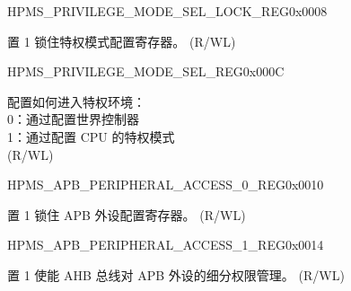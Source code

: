 


\begin{register}{H}{PMS\_PRIVILEGE\_MODE\_SEL\_LOCK\_REG}{0x0008}\label{regdesc:PMSPRIVILEGEMODESELLOCKREG}
%
%
\regnewline%
\begin{regdesc}\begin{reglist}
\label{fielddesc:PMSPRIVILEGEMODESELLOCK}\item [PMS\_PRIVILEGE\_MODE\_SEL\_LOCK] 置 1 锁住特权模式配置寄存器。 (R/WL)
\end{reglist}\end{regdesc}
\end{register}

\begin{register}{H}{PMS\_PRIVILEGE\_MODE\_SEL\_REG}{0x000C}\label{regdesc:PMSPRIVILEGEMODESELREG}
%
%
\regnewline%
\begin{regdesc}\begin{reglist}
\label{fielddesc:PMSPRIVILEGEMODESEL}\item [PMS\_PRIVILEGE\_MODE\_SEL]
配置如何进入特权环境：\\
0：通过配置世界控制器\\
1：通过配置 CPU 的特权模式\\
(R/WL)
\end{reglist}\end{regdesc}
\end{register}


\begin{register}{H}{PMS\_APB\_PERIPHERAL\_ACCESS\_0\_REG}{0x0010}\label{regdesc:PMSAPBPERIPHERALACCESS0REG}
%
%
\regnewline%
\begin{regdesc}\begin{reglist}
\label{fielddesc:PMSAPBPERIPHERALACCESSLOCK}\item [PMS\_APB\_PERIPHERAL\_ACCESS\_LOCK] 置 1 锁住 APB 外设配置寄存器。 (R/WL)
\end{reglist}\end{regdesc}
\end{register}


\begin{register}{H}{PMS\_APB\_PERIPHERAL\_ACCESS\_1\_REG}{0x0014}\label{regdesc:PMSAPBPERIPHERALACCESS1REG}
%
%
\regnewline%
\begin{regdesc}\begin{reglist}
\label{fielddesc:PMSAPBPERIPHERALACCESSSPLITBURST}\item [PMS\_APB\_PERIPHERAL\_ACCESS\_SPLIT\_BURST] 置 1 使能 AHB 总线对 APB 外设的细分权限管理。 (R/WL)
\end{reglist}\end{regdesc}
\end{register}


